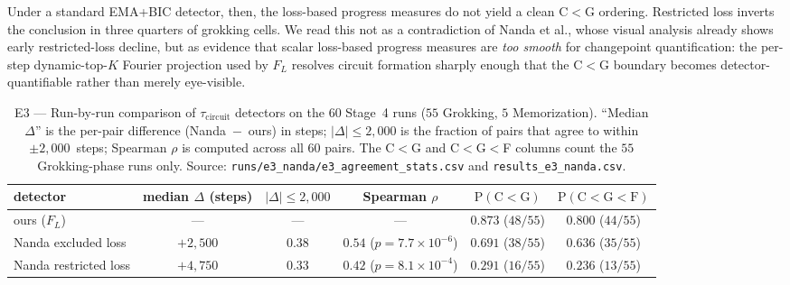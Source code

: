 \documentclass{article}
\newcommand{\taucirc}{\tau_{\mathrm{circuit}}}
\newcommand{\flogit}{F_{L}}
\begin{document}
Under a standard EMA+BIC detector, then, the loss-based progress
measures do not yield a clean C$<$G ordering.
Restricted loss inverts the conclusion in three quarters of
grokking cells.
We read this not as a contradiction of Nanda et al., whose
visual analysis already shows early restricted-loss decline, but
as evidence that scalar loss-based progress measures are
\emph{too smooth} for changepoint quantification: the per-step
dynamic-top-$K$ Fourier projection used by $\flogit$ resolves
circuit formation sharply enough that the C$<$G boundary becomes
detector-quantifiable rather than merely eye-visible.
\begin{table}[tbp]
  \centering
  \caption{E3 --- Run-by-run comparison of $\taucirc$ detectors
    on the $60$ Stage~4 runs ($55$ Grokking, $5$ Memorization).
    ``Median $\Delta$'' is the per-pair difference
    (Nanda~$-$~ours) in steps; $|\Delta|{\leq}2{,}000$ is the
    fraction of pairs that agree to within $\pm 2{,}000$~steps;
    Spearman $\rho$ is computed across all $60$ pairs.
    The C$<$G and C$<$G$<$F columns count the $55$
    Grokking-phase runs only.
    Source: \texttt{runs/e3\_nanda/e3\_agreement\_stats.csv} and
    \texttt{results\_e3\_nanda.csv}.}
  \label{tab:e3_nanda}
  \small
  \begin{tabular}{lccccc}
    \toprule
    detector & median $\Delta$ (steps) & $|\Delta|{\leq}2{,}000$ &
    Spearman $\rho$ & $\mathrm{P}(\mathrm{C}{<}\mathrm{G})$ &
    $\mathrm{P}(\mathrm{C}{<}\mathrm{G}{<}\mathrm{F})$ \\
    \midrule
    ours ($\flogit$)        & ---       & ---     & ---                       & $0.873$ ($48/55$) & $0.800$ ($44/55$) \\
    Nanda excluded loss     & $+2{,}500$ & $0.38$ & $0.54$ ($p{=}7.7{\times}10^{-6}$) & $0.691$ ($38/55$) & $0.636$ ($35/55$) \\
    Nanda restricted loss   & $+4{,}750$ & $0.33$ & $0.42$ ($p{=}8.1{\times}10^{-4}$) & $0.291$ ($16/55$) & $0.236$ ($13/55$) \\
    \bottomrule
  \end{tabular}
\end{table}
\end{document}
